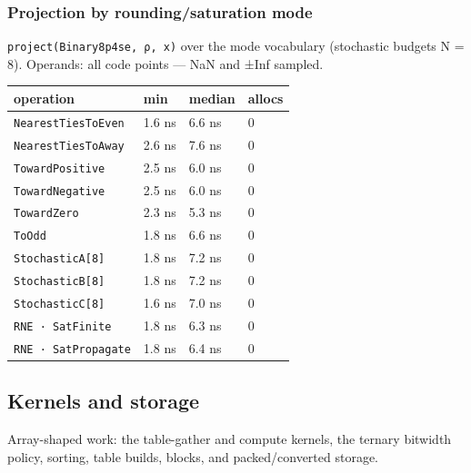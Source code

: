 \subsubsection{Projection by rounding/saturation mode}



\label{15662701981835679547}{}


\texttt{project(\allowbreak{}Binary8p4se, ρ, x)} over the mode vocabulary (stochastic budgets N = 8). Operands: all code points — NaN and ±Inf sampled.




\begin{table}[h]
\centering
\begin{tabulary}{\linewidth}{L L L L}
\toprule
operation & min & median & allocs \\
\toprule
\texttt{NearestTiesToEven} & 1.6 ns & 6.6 ns & 0 \\
\texttt{NearestTiesToAway} & 2.6 ns & 7.6 ns & 0 \\
\texttt{TowardPositive} & 2.5 ns & 6.0 ns & 0 \\
\texttt{TowardNegative} & 2.5 ns & 6.0 ns & 0 \\
\texttt{TowardZero} & 2.3 ns & 5.3 ns & 0 \\
\texttt{ToOdd} & 1.8 ns & 6.6 ns & 0 \\
\texttt{StochasticA[8]} & 1.8 ns & 7.2 ns & 0 \\
\texttt{StochasticB[8]} & 1.8 ns & 7.2 ns & 0 \\
\texttt{StochasticC[8]} & 1.6 ns & 7.0 ns & 0 \\
\texttt{RNE · SatFinite} & 1.8 ns & 6.3 ns & 0 \\
\texttt{RNE · SatPropagate} & 1.8 ns & 6.4 ns & 0 \\
\bottomrule
\end{tabulary}

\end{table}



\subsection{Kernels and storage}



\label{9956393270762268485}{}


Array-shaped work: the table-gather and compute kernels, the ternary bitwidth policy, sorting, table builds, blocks, and packed/converted storage.



